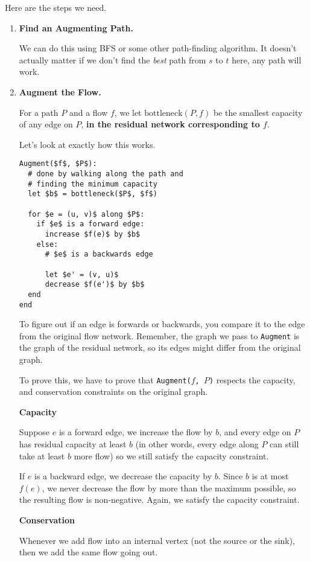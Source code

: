 \documentclass[12pt]{article}
\begin{document}
  Here are the steps we need.

  \begin{enumerate}
    \item {\bf Find an Augmenting Path.}

      We can do this using BFS or some other path-finding algorithm. It doesn't
      actually matter if we don't find the {\it best} path from $s$ to $t$
      here, any path will work.

    \item {\bf Augment the Flow.}

      For a path $P$ and a flow $f$, we let $\text{bottleneck}(P, f)$ be the
      smallest capacity of any edge on $P$, {\bf in the residual network
      corresponding to $f$}.

      Let's look at exactly how this works.

      \begin{lstlisting}
Augment($f$, $P$):
  # done by walking along the path and
  # finding the minimum capacity
  let $b$ = bottleneck($P$, $f$)

  for $e = (u, v)$ along $P$:
    if $e$ is a forward edge:
      increase $f(e)$ by $b$
    else:
      # $e$ is a backwards edge

      let $e' = (v, u)$
      decrease $f(e')$ by $b$
  end
end
      \end{lstlisting}

      To figure out if an edge is forwards or backwards, you compare it to the
      edge from the original flow network. Remember, the graph we pass to
      \texttt{Augment} is the graph of the residual network, so its edges might
      differ from the original graph.

      {
        To prove this, we have to prove that \texttt{Augment($f$, $P$)} respects
        the capacity, and conservation constraints on the original graph.

        {\bf Capacity}

        Suppose $e$ is a forward edge, we increase the flow by $b$, and every edge
        on $P$ has residual capacity at least $b$ (in other words, every edge along
        $P$ can still take at least $b$ more flow) so we still satisfy the capacity
        constraint.

        If $e$ is a backward edge, we decrease the capacity by $b$. Since $b$ is at
        most $f(e)$, we never decrease the flow by more than the maximum possible,
        so the resulting flow is non-negative. Again, we satisfy the capacity
        constraint.

        {\bf Conservation}

        Whenever we add flow into an internal vertex (not the source or the
        sink), then we add the same flow going out.
      }
    
  \end{enumerate}
\end{document}
